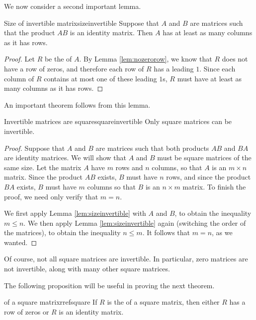 We now consider a second important lemma.

\begin{lemma}{Size of invertible matrix}{sizeinvertible}
Suppose that $A$ and $B$ are matrices such that the product $AB$ is an identity matrix. Then $A$ has at least as many columns as it has rows.
\end{lemma}

\begin{proof}
Let $R$ be the {\rref} of $A$. By Lemma \ref{lem:nozerorow}, we know that $R$ does not have a row of zeros, and therefore each row of $R$ has a leading $1$. Since each column of $R$ contains at most one of these leading $1$s, $R$ must have at least as many columns as it has rows.
\end{proof}

An important theorem follows from this lemma. 

\begin{theorem}{Invertible matrices are square}{squareinvertible}
Only square matrices can be invertible.
\end{theorem}

\begin{proof}
Suppose that $A$ and $B$ are matrices such that both products $AB$ and $BA$ are identity matrices. We will show that $A$ and $B$ must be square matrices of the same size. Let the matrix $A$ have $m$ rows and $n$ columns, so that $A$ is an $m \times n$ matrix. Since the product $AB$ exists, $B$ must have $n$ rows, and since the product $BA$ exists, $B$ must have $m$ columns so that $B$ is an $n \times m$ matrix. To finish the proof, we need only verify that $m=n$. 

We first apply Lemma \ref{lem:sizeinvertible} with $A$ and $B$, to obtain the inequality $m \leq n$. We then apply Lemma \ref{lem:sizeinvertible} again (switching the order of the matrices), to obtain the inequality $n \leq m$. It follows that $m=n$, as we wanted.
\end{proof}

Of course, not all square matrices are invertible. In particular, zero matrices are not invertible, along with many other square matrices. 

The following proposition will be useful in proving the next theorem.

\begin{proposition}{{\Rref} of a square matrix}{rrefsquare}
If $R$ is the {\rref} of a square matrix, then either $R$ has a row of zeros or $R$ is an identity matrix. 
\end{proposition}

